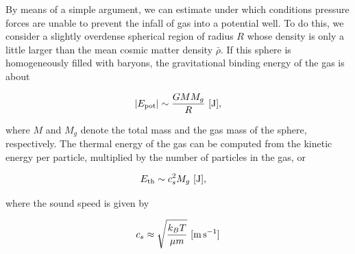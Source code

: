 \documentclass[a4paper,11pt]{article}
\begin{document}
{\noindent}By means of a simple argument, we can estimate under which conditions pressure forces are unable to prevent the infall of gas into a potential well. To do this, we consider a slightly overdense spherical region of radius $R$ whose density is only a little larger than the mean cosmic matter density $\bar{\rho}$. If this sphere is homogeneously filled with baryons, the gravitational binding energy of the gas is about

\begin{align*}
    \lvert E_\mathrm{pot} \rvert \sim \frac{GMM_g}{R} ~ [{\rm J}],
\end{align*}

{\noindent}where $M$ and $M_g$ denote the total mass and the gas mass of the sphere, respectively. The thermal energy of the gas can be computed from the kinetic energy per particle, multiplied by the number of particles in the gas, or

\begin{align*}
    E_\mathrm{th} &\sim c_s^2M_g ~ [{\rm J}],    
\end{align*}

{\noindent}where the sound speed is given by

\begin{align*}
    c_s \approx \sqrt{\frac{k_BT}{\mu m}} ~ [{\rm m\,s^{-1}}]
\end{align*}
\end{document}
